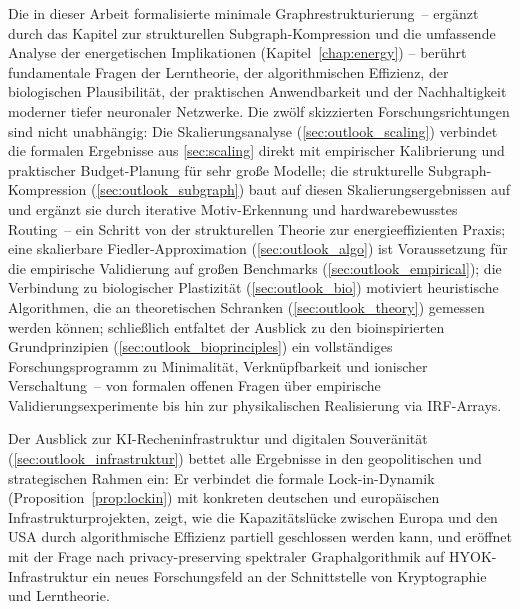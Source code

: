 \documentclass[12pt, a4paper, openany]{report}
\begin{document}
Die in dieser Arbeit formalisierte minimale Graphrestrukturierung~-- ergänzt
durch das Kapitel zur strukturellen Subgraph-Kompression und die
umfassende Analyse der energetischen Implikationen (Kapitel~\ref{chap:energy})
-- berührt fundamentale Fragen der Lerntheorie, der algorithmischen Effizienz,
der biologischen Plausibilität, der praktischen Anwendbarkeit und der
Nachhaltigkeit moderner tiefer neuronaler Netzwerke.  Die zwölf skizzierten
Forschungsrichtungen sind nicht unabhängig: Die Skalierungsanalyse
(\cref{sec:outlook_scaling}) verbindet die formalen Ergebnisse aus
\cref{sec:scaling} direkt mit empirischer Kalibrierung und praktischer
Budget-Planung für sehr große Modelle; die strukturelle Subgraph-Kompression
(\cref{sec:outlook_subgraph}) baut auf diesen Skalierungsergebnissen auf
und ergänzt sie durch iterative Motiv-Erkennung und hardwarebewusstes
Routing~-- ein Schritt von der strukturellen Theorie zur
energieeffizienten Praxis; eine skalierbare Fiedler-Approximation
(\cref{sec:outlook_algo}) ist Voraussetzung für die empirische Validierung
auf großen Benchmarks (\cref{sec:outlook_empirical}); die Verbindung zu
biologischer Plastizität (\cref{sec:outlook_bio}) motiviert heuristische
Algorithmen, die an theoretischen Schranken (\cref{sec:outlook_theory})
gemessen werden können; schließlich entfaltet der Ausblick zu den
bioinspirierten Grundprinzipien (\cref{sec:outlook_bioprinciples}) ein
vollständiges Forschungsprogramm zu Minimalität, Verknüpfbarkeit und
ionischer Verschaltung~-- von formalen offenen Fragen über empirische
Validierungsexperimente bis hin zur physikalischen Realisierung via IRF-Arrays.

Der Ausblick zur KI-Recheninfrastruktur und digitalen Souveränität
(\cref{sec:outlook_infrastruktur}) bettet alle Ergebnisse in den
geopolitischen und strategischen Rahmen ein: Er verbindet die formale
Lock-in-Dynamik (Proposition~\ref{prop:lockin}) mit konkreten deutschen
und europäischen Infrastrukturprojekten, zeigt, wie die Kapazitätslücke
zwischen Europa und den USA durch algorithmische Effizienz partiell
geschlossen werden kann, und eröffnet mit der Frage nach
privacy-preserving spektraler Graphalgorithmik auf HYOK-Infrastruktur
ein neues Forschungsfeld an der Schnittstelle von Kryptographie und
Lerntheorie.
\end{document}
